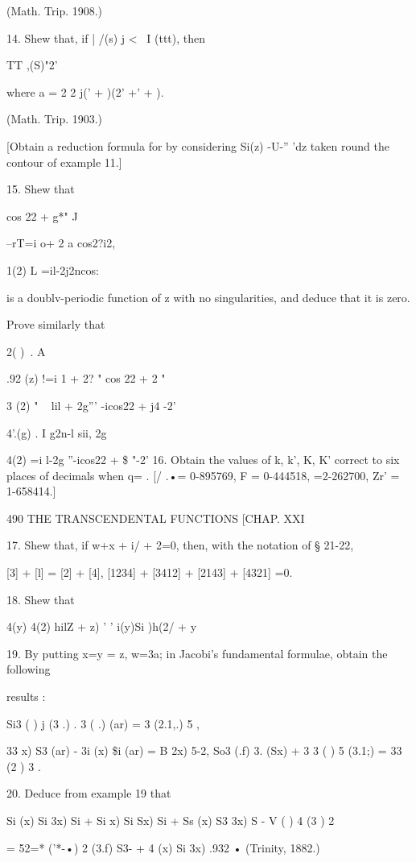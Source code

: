 (Math. Trip. 1908.) 

14. Shew that, if | /(s) j < \ I (ttt), then 

TT  ,(S)"2' 

where a  = 2 2 j('  +  )(2' +' + ). 

(Math. Trip. 1903.) 

[Obtain a reduction formula for    by considering    Si(z) -U-'' 'dz taken round the 
contour of example 11.] 

15. Shew that 

cos 22 + g*" J 



 --rT=i o+ 2 a cos2?i2, 



 1(2) L  =il-2j2ncos: 

is a doublv-periodic function of z with no singularities, and deduce that it is zero. 

Prove similarly that 

 2( )\  . A%

.92 (z)  !=i 1 + 2? " cos 22 + 2 " 

 3 (2) " ~  lil + 2g''' -icos22 + j4 -2' 

 4'.(g) . I g2n-l sii, 2g 

  4(2)  =i l-2g ''-icos22 + \$ "-2' 
16. Obtain the values of k, k', K, K' correct to six places of decimals when q= . 
[/ .•= 0-895769, F = 0-444518, 
 =2-262700, Zr' = 1-658414.] 



490 THE TRANSCENDENTAL FUNCTIONS [CHAP. XXI 

17. Shew that, if w+x + i/ + 2=0, then, with the notation of § 21-22, 

[3] + [l] = [2] + [4], 
[1234] + [3412] + [2143] + [4321] =0. 

18. Shew that 

 4(y)  4(2) hilZ + z) ' ' i(y)Si  )h(2/ +  y 

19. By putting x=y = z, w=3a; in Jacobi's fundamental formulae, obtain the following 

results : 

Si3 ( )  j (3 .)  .  3 ( .)   (ar) =  3 (2.1,.) 5  , 

 33  x) S3 (ar) - 3i  (x) \$i (ar) = B   2x) 5-2, 
So3 (.f) 3. (Sx) + 3 3 ( ) 5  (3.1;) =  33 (2 )  3 . 

20. Deduce from example 19 that 

 Si  (x) Si  3x) Si  + Si   x) Si  Sx) Si     +  Ss  (x) S3  3x) S  - V ( )  4 (3 )  2    

=  52=* ('*-•)  2 (3.f) S3- +  4  (x) Si  3x) .932   • 
(Trinity, 1882.) 


